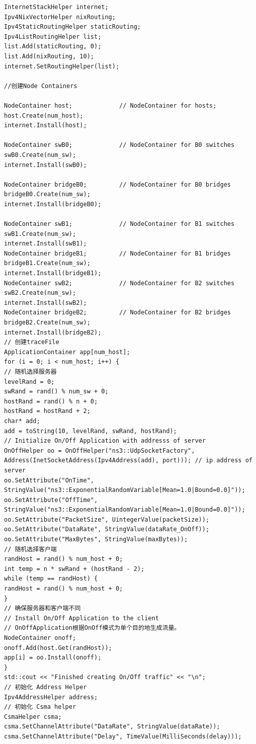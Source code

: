 \documentclass[lang=cn,11pt,a4paper,cite=authoryear]{elegantpaper}
\begin{document}
\begin{lstlisting}
InternetStackHelper internet;
Ipv4NixVectorHelper nixRouting;
Ipv4StaticRoutingHelper staticRouting;
Ipv4ListRoutingHelper list;
list.Add(staticRouting, 0);
list.Add(nixRouting, 10);
internet.SetRoutingHelper(list);
 
//创建Node Containers
 
NodeContainer host;				// NodeContainer for hosts;  				
host.Create(num_host);
internet.Install(host);
 
NodeContainer swB0;				// NodeContainer for B0 switches 
swB0.Create(num_sw);
internet.Install(swB0);
 
NodeContainer bridgeB0;			// NodeContainer for B0 bridges
bridgeB0.Create(num_sw);
internet.Install(bridgeB0);
 
NodeContainer swB1;				// NodeContainer for B1 switches
swB1.Create(num_sw);
internet.Install(swB1);
NodeContainer bridgeB1;			// NodeContainer for B1 bridges
bridgeB1.Create(num_sw);
internet.Install(bridgeB1);
NodeContainer swB2;				// NodeContainer for B2 switches
swB2.Create(num_sw);
internet.Install(swB2);
NodeContainer bridgeB2;			// NodeContainer for B2 bridges
bridgeB2.Create(num_sw);
internet.Install(bridgeB2);
// 创建traceFile
ApplicationContainer app[num_host];
for (i = 0; i < num_host; i++) {
// 随机选择服务器
levelRand = 0;
swRand = rand() % num_sw + 0;
hostRand = rand() % n + 0;
hostRand = hostRand + 2;
char* add;
add = toString(10, levelRand, swRand, hostRand);
// Initialize On/Off Application with addresss of server
OnOffHelper oo = OnOffHelper("ns3::UdpSocketFactory", Address(InetSocketAddress(Ipv4Address(add), port))); // ip address of server
oo.SetAttribute("OnTime", StringValue("ns3::ExponentialRandomVariable[Mean=1.0|Bound=0.0]"));
oo.SetAttribute("OffTime", StringValue("ns3::ExponentialRandomVariable[Mean=1.0|Bound=0.0]"));
oo.SetAttribute("PacketSize", UintegerValue(packetSize));
oo.SetAttribute("DataRate", StringValue(dataRate_OnOff));
oo.SetAttribute("MaxBytes", StringValue(maxBytes));
// 随机选择客户端
randHost = rand() % num_host + 0;
int temp = n * swRand + (hostRand - 2);
while (temp == randHost) {
randHost = rand() % num_host + 0;
}
// 确保服务器和客户端不同
// Install On/Off Application to the client
// OnOffApplication根据OnOff模式为单个目的地生成流量。
NodeContainer onoff;
onoff.Add(host.Get(randHost));
app[i] = oo.Install(onoff);
}
std::cout << "Finished creating On/Off traffic" << "\n";
// 初始化 Address Helper
Ipv4AddressHelper address;
// 初始化 Csma helper
CsmaHelper csma;
csma.SetChannelAttribute("DataRate", StringValue(dataRate));
csma.SetChannelAttribute("Delay", TimeValue(MilliSeconds(delay)));

\end{lstlisting}
\end{document}
